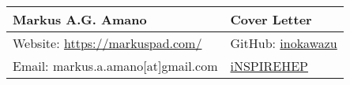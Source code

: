 \documentclass[fontsize=12pt]{article}
\begin{document}
\begin{center}
  \begin{tabularx}{\textwidth} { 
      >{\raggedright\arraybackslash}X 
    >{\raggedleft\arraybackslash}X  }
    \huge Markus A.G. Amano & Cover Letter\\
    \hline
    Website: \url{https://markuspad.com/}& 
    GitHub: \href{https://github.com/inokawazu}{inokawazu}\\
    Email: markus.a.amano[at]gmail.com & \href{https://inspirehep.net/authors/1778034}{iNSPIREHEP}\\
  \end{tabularx}
\end{center}
\end{document}
